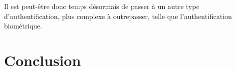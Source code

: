 \documentclass[12pt,a4paper]{article}
\begin{document}
Il est peut-être donc temps désormais de passer à un autre type d'authentification, plus complexe à outrepasser, telle que l'authentification biométrique.




\clearpage
\section*{Conclusion}
\end{document}
